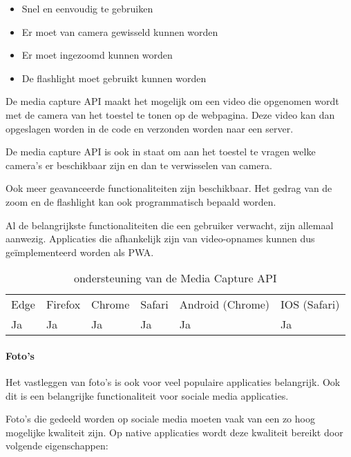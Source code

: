    \begin{itemize}
     \item	Snel en eenvoudig te gebruiken
     \item	Er moet van camera gewisseld kunnen worden
     \item	Er moet ingezoomd kunnen worden
     \item	De flashlight moet gebruikt kunnen worden
   \end{itemize}

De media capture API \autocite{DzungDTran}  maakt het mogelijk om een video die opgenomen wordt met de camera van het toestel te tonen op de webpagina. Deze video kan dan opgeslagen worden in de code en verzonden worden naar een server. 

\autocite{Fransson2017}

De media capture API is ook in staat om aan het toestel te vragen welke camera’s er beschikbaar zijn en dan te verwisselen van camera.

\autocite{Scales2020a}

Ook meer geavanceerde functionaliteiten zijn beschikbaar. Het gedrag van de zoom en de flashlight kan ook programmatisch bepaald worden.

\autocite{Oberhofer2017} \autocite{Ogundipe2018}


Al de belangrijkste functionaliteiten die een gebruiker verwacht, zijn allemaal aanwezig. Applicaties die afhankelijk zijn van video-opnames kunnen dus geïmplementeerd worden als PWA.

\begin{table}[]
	\begin{tabular}{llllll}
		Edge & Firefox & Chrome & Safari & Android (Chrome) & IOS (Safari) \\
		Ja   & Ja      & Ja     & Ja     & Ja               & Ja          
	\end{tabular}	
	\caption{ondersteuning van de Media Capture API}
	\label{ondersteuning van de Media Capture API}
\end{table}



\paragraph{Foto's }

Het vastleggen van foto’s is ook voor veel populaire applicaties belangrijk. Ook dit is een belangrijke functionaliteit voor sociale media applicaties.

Foto’s die gedeeld worden op sociale media moeten vaak van een zo hoog mogelijke kwaliteit zijn. Op native applicaties wordt deze kwaliteit bereikt door volgende eigenschappen: 

